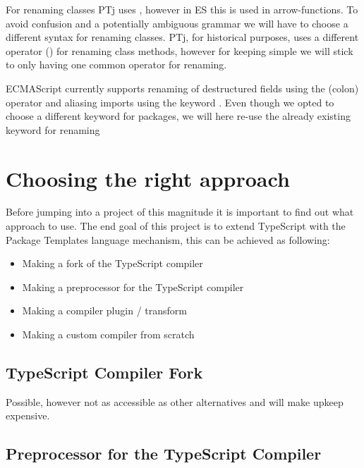 For renaming classes PTj uses \codeword{=>}, however in ES this is used in arrow-functions\cite{arrowfunction}.
To avoid confusion and a potentially ambiguous grammar we will have to choose a different syntax for renaming classes.
PTj, for historical purposes, uses a different operator (\codeword{->}) for renaming class methods, however for keeping \languagename simple we will stick to only having one common operator for renaming.

ECMAScript currently supports renaming of destructured fields using the \codeword{:}(colon) operator and aliasing imports using the keyword .
Even though we opted to choose a different keyword for packages, we will here re-use the already existing  keyword for renaming 



\section{Choosing the right approach}\label{sec:choosing-the-right-approach}

Before jumping into a project of this magnitude it is important to find out what approach to use. 
The end goal of this project is to extend TypeScript with the Package Templates language mechanism,
this can be achieved as following:

\begin{itemize}
    \item Making a fork of the TypeScript compiler
    \item Making a preprocessor for the TypeScript compiler
    \item Making a compiler plugin / transform
    \item Making a custom compiler from scratch
\end{itemize}

\subsection{TypeScript Compiler Fork}\label{subsec:typescript-compiler-fork}

Possible, however not as accessible as other alternatives and will make upkeep expensive.

\subsection{Preprocessor for the TypeScript Compiler}\label{subsec:preprocessor-for-the-typescript-compiler}

